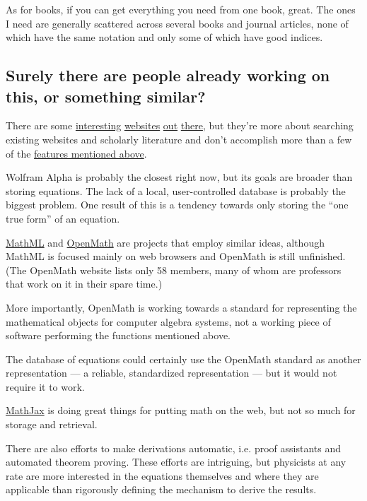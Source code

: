 \documentclass[12pt,letterpaper]{article}
\begin{document}
As for books, if you can get everything you need from one book, great. The ones I need are generally scattered across several books and journal articles, none of which have the same notation and only some of which have good indices.

\subsection{Surely there are people already working on this, or something similar?}

There are some
\href{http://symbolab.com/}
{interesting}
\href{http://latexsearch.com/}
{websites}
\href{http://www.dessci.com/en/reference/searching/math-searching.htm}
{out}
\href{http://www.equationsheet.com/}
{there},
but they're more about searching existing websites and scholarly literature
and don't accomplish more than a few of the \hyperref[sec:features]{features mentioned above}.

Wolfram Alpha is probably the closest right now,
but its goals are broader than storing equations.
The lack of a local, user-controlled database is probably the biggest problem.
One result of this is a tendency towards only storing the ``one true form'' of an equation.

\href{http://www.w3.org/Math/}
{MathML}
and
\href{http://www.openmath.org/}
{OpenMath} are projects that employ similar ideas,
although MathML is focused mainly on web browsers and OpenMath is still unfinished.
(The OpenMath website lists only 58 members,
many of whom are professors that work on it in their spare time.)

More importantly,
OpenMath is working towards a standard for representing the mathematical objects for computer algebra systems,
not a working piece of software performing the functions mentioned above.

The database of equations could certainly use the OpenMath standard as another representation
--- a reliable, standardized representation ---
but it would not require it to work.

\href{http://www.mathjax.org/}
{MathJax} is doing great things for putting math on the web,
but not so much for storage and retrieval.

There are also efforts to make derivations automatic,
i.e. proof assistants and automated theorem proving.
These efforts are intriguing,
but physicists at any rate are more interested in the equations themselves and where they are applicable
than rigorously defining the mechanism to derive the results.
\end{document}
